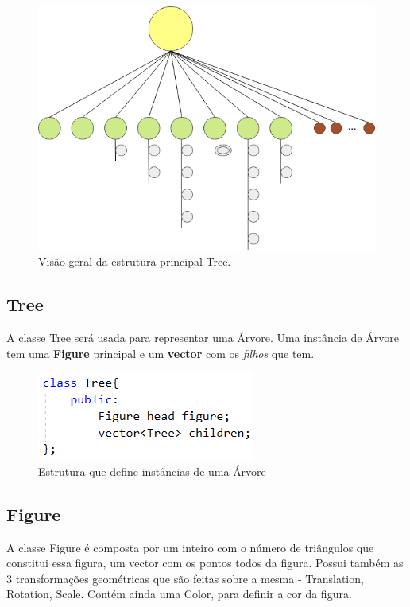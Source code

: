 \documentclass[a4paper]{article}
\begin{document}
\begin{figure}[H]
\centering
\includegraphics[scale=0.6]{tree_struct.png}
\caption{Visão geral da estrutura principal Tree.}
\label{img:tree_struct}
\end{figure}


\subsection{Tree}
\label{sec:tree}

A classe Tree será usada para representar uma Árvore. Uma instância de Árvore tem uma \textbf{Figure} principal e um \textbf{vector} com os \textit{filhos} que tem.

\begin{figure}[H]
\centering
\includegraphics[scale=0.8]{tree.png}
\caption{Estrutura que define instâncias de uma Árvore}
\label{img:Tree}
\end{figure}


\subsection{Figure}
\label{sec:figure}

A classe Figure é composta por um inteiro com o número de triângulos que constitui essa figura, um vector com os pontos todos da figura. Possui também as 3 transformações geométricas que são feitas sobre a mesma - Translation, Rotation, Scale. Contém ainda uma Color, para definir a cor da figura.
\end{document}

